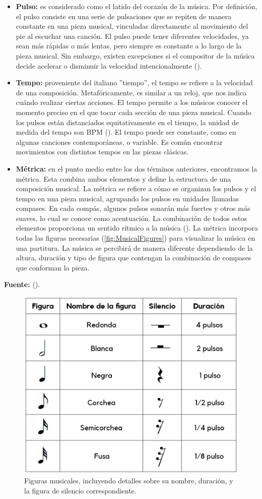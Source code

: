 \begin{itemize}
	\item \textbf{Pulso:} es considerado como el latido del corazón de la música. Por definición, el pulso consiste en una serie de pulsaciones que se repiten de manera constante en una pieza musical, vinculadas directamente al movimiento del pie al escuchar una canción. El pulso puede tener diferentes velocidades, ya sean más rápidas o más lentas, pero siempre es constante a lo largo de la pieza musical. Sin embargo, existen excepciones si el compositor de la música decide acelerar o disminuir la velocidad intencionalmente (\cite{VIOLÍNZN:2024}).
	\item \textbf{Tempo:} proveniente del italiano ''tiempo'', el tempo se refiere a la velocidad de una composición. Metafóricamente, es similar a un reloj, que nos indica cuándo realizar ciertas acciones. El tempo permite a los músicos conocer el momento preciso en el que tocar cada sección de una pieza musical. Cuando los pulsos están distanciados equitativamente en el tiempo, la unidad de medida del tempo son BPM (\cite{MASTEREDBLOGS:2021}). El tempo puede ser constante, como en algunas canciones contemporáneas, o variable. Es común encontrar movimientos con distintos tempos en las piezas clásicas.
	\item \textbf{Métrica:} en el punto medio entre los dos términos anteriores, encontramos la métrica. Esta combina ambos elementos y define la estructura de una composición musical. La métrica se refiere a cómo se organizan los pulsos y el tempo en una pieza musical, agrupando los pulsos en unidades llamadas compases. En cada compás, algunos pulsos sonarán más fuertes y otros más suaves, lo cual se conoce como acentuación. La combinación de todos estos elementos proporciona un sentido rítmico a la música (\cite{COMPOMUSICAL:2024}). La métrica incorpora todas las figuras necesarias (\autoref{fig:MusicalFigures}) para visualizar la música en una partitura. La música se percibirá de manera diferente dependiendo de la altura, duración y tipo de figura que contengan la combinación de compases que conforman la pieza.
\end{itemize}

\begin{center}
	\textbf{Fuente:} \citeauthor{VIOLÍNZN:2024} (\citeyear{VIOLÍNZN:2024}).
	\vspace{-18pt}
\end{center}

\begin{figure}[h!]
	\centering
	\includegraphics[width=0.4\linewidth]{Figuras/Estado/FigurasMusicales.jpg}
	\caption{Figuras musicales, incluyendo detalles sobre su nombre, duración, y la figura de silencio correspondiente.}
	\label{fig:MusicalFigures}
\end{figure}

